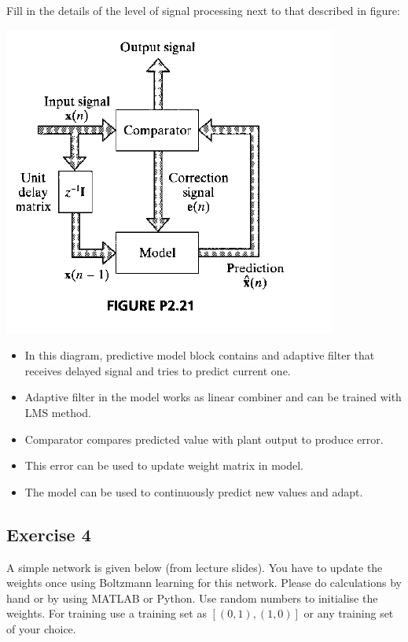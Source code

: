 \documentclass[a4paper, 12pt]{article}
\begin{document}
Fill in the details of the level of signal processing next to that described in figure:

\begin{center}
  \includegraphics[scale=1]{21}
\end{center}

\begin{itemize}
\item In this diagram, predictive model block contains and adaptive filter that receives delayed signal and tries to predict current one.
\item Adaptive filter in the model works as linear combiner and can be trained with LMS method.
\item Comparator compares predicted value with plant output to produce error.
\item This error can be used to update weight matrix in model. 
\item The model can be used to continuously predict new values and adapt.
\end{itemize}


\subsection{Exercise 4}

A simple network is given below (from lecture slides). You have to update the weights once using Boltzmann learning for this network. Please do calculations by hand or by using MATLAB or Python.  Use random numbers to initialise the weights. For training use a training set as $[(0, 1), (1, 0)]$ or any training set of your choice.
\end{document}
